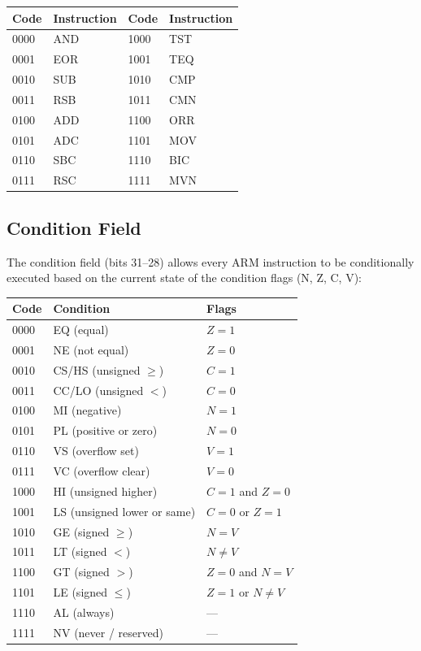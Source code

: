 \documentclass[11pt, a4paper, notitlepage]{report}
\theoremstyle{definition}
\theoremstyle{remark}
\theoremstyle{definition}
\begin{document}
\begin{center}
\begin{tabular}{llll}
\toprule
\textbf{Code} & \textbf{Instruction} & \textbf{Code} & \textbf{Instruction} \\
\midrule
0000 & AND & 1000 & TST \\
0001 & EOR & 1001 & TEQ \\
0010 & SUB & 1010 & CMP \\
0011 & RSB & 1011 & CMN \\
0100 & ADD & 1100 & ORR \\
0101 & ADC & 1101 & MOV \\
0110 & SBC & 1110 & BIC \\
0111 & RSC & 1111 & MVN \\
\bottomrule
\end{tabular}
\end{center}

\subsection{Condition Field}

The condition field (bits 31--28) allows every ARM instruction to be conditionally executed based on the current state of the condition flags (N, Z, C, V):

\begin{center}
\begin{tabularx}{\textwidth}{llX}
\toprule
\textbf{Code} & \textbf{Condition} & \textbf{Flags} \\
\midrule
0000 & EQ (equal) & $Z = 1$ \\
0001 & NE (not equal) & $Z = 0$ \\
0010 & CS/HS (unsigned $\ge$) & $C = 1$ \\
0011 & CC/LO (unsigned $<$) & $C = 0$ \\
0100 & MI (negative) & $N = 1$ \\
0101 & PL (positive or zero) & $N = 0$ \\
0110 & VS (overflow set) & $V = 1$ \\
0111 & VC (overflow clear) & $V = 0$ \\
1000 & HI (unsigned higher) & $C = 1$ and $Z = 0$ \\
1001 & LS (unsigned lower or same) & $C = 0$ or $Z = 1$ \\
1010 & GE (signed $\ge$) & $N = V$ \\
1011 & LT (signed $<$) & $N \ne V$ \\
1100 & GT (signed $>$) & $Z = 0$ and $N = V$ \\
1101 & LE (signed $\le$) & $Z = 1$ or $N \ne V$ \\
1110 & AL (always) & --- \\
1111 & NV (never / reserved) & --- \\
\bottomrule
\end{tabularx}
\end{center}
\end{document}
